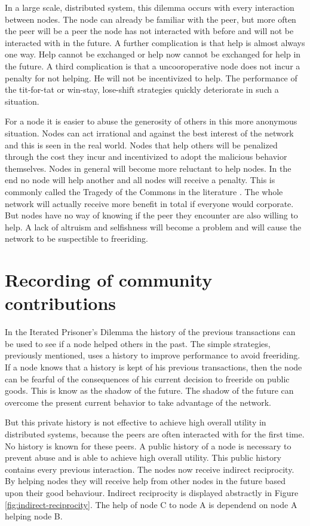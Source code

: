 In a large scale, distributed system, this dilemma occurs with every interaction between nodes.
The node can already be familiar with the peer,
but more often the peer will be a peer the node has not interacted with before
and will not be interacted with in the future.
A further complication is that help is almost always one way.
Help cannot be exchanged or help now cannot be exchanged for help in the future\cite{Lai-Incentives}.
A third complication is that a uncooroperative node does not incur a penalty for not helping.
He will not be incentivized to help.
The performance of the tit-for-tat or win-stay, lose-shift strategies
quickly deteriorate in such a situation.

For a node it is easier to abuse the generosity of others in this more anonymous situation.
Nodes can act irrational and against the best interest of the network
and this is seen in the real world\cite{Adar-Freeriding}.
Nodes that help others will be penalized through the cost they incur
and incentivized to adopt the malicious behavior themselves.
Nodes in general will become more reluctant to help nodes\cite{Nowak-PrisonerDilemma}.
In the end no node will help another and all nodes will receive a penalty.
This is commonly called the Tragedy of the Commons in the literature \cite{Hardin-Tragedy}.
The whole network will actually receive more benefit in total if everyone would corporate.
But nodes have no way of knowing if the peer they encounter are also willing to help.
A lack of altruism and selfishness will become a problem 
and will cause the network to be suspectible to freeriding.

\section{Recording of community contributions}
In the Iterated Prisoner's Dilemma the history of the previous transactions can be used 
to see if a node helped others in the past.
The simple strategies, previously mentioned, uses a history to improve performance
to avoid freeriding.
If a node knows that a history is kept of his previous transactions,
then the node can be fearful of the consequences of his current decision to freeride on public goods.
This is know as the shadow of the future\cite{bo-shadow}.
The shadow of the future can overcome the present current behavior to take advantage of the network.

But this private history is not effective to achieve high overall utility in distributed systems,
because the peers are often interacted with for the first time.
No history is known for these peers.
A public history of a node is necessary to prevent abuse
and is able to achieve high overall utility\cite{Lai-Incentives}.
This public history contains every previous interaction.
The nodes now receive indirect reciprocity\cite{Nowak-Cooperation}.
By helping nodes they will receive help from other nodes in the future based upon their good behaviour.
Indirect reciprocity is displayed abstractly in Figure \ref{fig:indirect-reciprocity}.
The help of node C to node A is dependend on node A helping node B.

